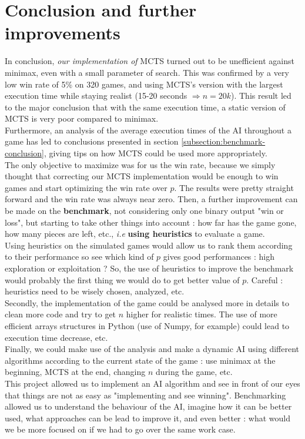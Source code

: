 \section{Conclusion and further improvements}
In conclusion, \textit{our implementation of} MCTS turned out to be unefficient against minimax, even with a small parameter of search. This was confirmed by a very low win rate of 5\% on 320 games, and using MCTS's version with the largest execution time while staying realist (15-20 seconds $\Rightarrow n=20k$). This result led to the major conclusion that with the same execution time, a static version of MCTS is very poor compared to minimax. \\

Furthermore, an analysis of the average execution times of the AI throughout a game has led to conclusions presented in section \ref{subsection:benchmark-conclusion}, giving tips on how MCTS could be used more appropriately. \\

The only objective to maximize was for us the win rate, because we simply thought that correcting our MCTS implementation would be enough to win games and start optimizing the win rate over $p$. The results were pretty straight forward and the win rate was always near zero. Then, a further improvement can be made on the \textbf{benchmark}, not considering only one binary output "win or loss", but starting to take other things into account : how far has the game gone, how many pieces are left, etc., \textit{i.e} \textbf{using heuristics} to evaluate a game. \\

Using heuristics on the simulated games would allow us to rank them according to their performance so see which kind of $p$ gives good performances : high exploration or exploitation ? So, the use of heuristics to improve the benchmark would probably the first thing we would do to get better value of $p$. Careful : heuristics need to be wisely chosen, analyzed, etc. \\

Secondly, the implementation of the game could be analysed more in details to clean more code and try to get $n$ higher for realistic times. The use of more efficient arrays structures in Python (use of Numpy, for example) could lead to execution time decrease, etc. \\

Finally, we could make use of the analysis and make a dynamic AI using different algorithms according to the current state of the game : use minimax at the beginning, MCTS at the end, changing $n$ during the game, etc.  \\

This project allowed us to implement an AI algorithm and see in front of our eyes that things are not as easy as "implementing and see winning". Benchmarking allowed us to understand the behaviour of the AI, imagine how it can be better used, what approaches can be lead to improve it, and even better : what would we be more focused on if we had to go over the same work case.